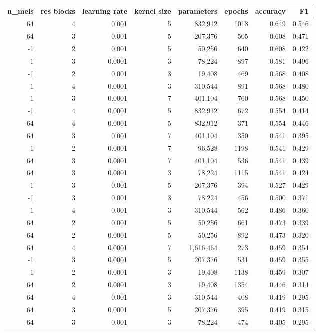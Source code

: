 \begin{tabular}{rrrrrrrr}
\toprule
\textbf{n\_mels} & \textbf{res blocks} & \textbf{learning rate} & \textbf{kernel size}& \textbf{parameters} & \textbf{epochs} & \textbf{accuracy} & \textbf{F1} \\
\midrule
64 & 4 & 0.001 & 5 & 832,912 & 1018 & 0.649 & 0.546 \\
64 & 3 & 0.001 & 5 & 207,376 & 505 & 0.608 & 0.471 \\
-1 & 2 & 0.001 & 5 & 50,256 & 640 & 0.608 & 0.422 \\
-1 & 3 & 0.0001 & 3 & 78,224 & 897 & 0.581 & 0.496 \\
-1 & 2 & 0.001 & 3 & 19,408 & 469 & 0.568 & 0.408 \\
-1 & 4 & 0.0001 & 3 & 310,544 & 891 & 0.568 & 0.480 \\
-1 & 3 & 0.0001 & 7 & 401,104 & 760 & 0.568 & 0.450 \\
-1 & 4 & 0.0001 & 5 & 832,912 & 672 & 0.554 & 0.414 \\
64 & 4 & 0.0001 & 5 & 832,912 & 371 & 0.554 & 0.446 \\
64 & 3 & 0.001 & 7 & 401,104 & 350 & 0.541 & 0.395 \\
-1 & 2 & 0.0001 & 7 & 96,528 & 1198 & 0.541 & 0.429 \\
64 & 3 & 0.0001 & 7 & 401,104 & 536 & 0.541 & 0.439 \\
64 & 3 & 0.0001 & 3 & 78,224 & 1115 & 0.541 & 0.424 \\
-1 & 3 & 0.001 & 5 & 207,376 & 394 & 0.527 & 0.429 \\
-1 & 3 & 0.001 & 3 & 78,224 & 456 & 0.500 & 0.371 \\
-1 & 4 & 0.001 & 3 & 310,544 & 562 & 0.486 & 0.360 \\
64 & 2 & 0.001 & 5 & 50,256 & 661 & 0.473 & 0.339 \\
64 & 2 & 0.0001 & 5 & 50,256 & 892 & 0.473 & 0.320 \\
64 & 4 & 0.0001 & 7 & 1,616,464 & 273 & 0.459 & 0.354 \\
-1 & 3 & 0.0001 & 5 & 207,376 & 531 & 0.459 & 0.355 \\
-1 & 2 & 0.0001 & 3 & 19,408 & 1138 & 0.459 & 0.307 \\
64 & 2 & 0.0001 & 3 & 19,408 & 1354 & 0.446 & 0.314 \\
64 & 4 & 0.001 & 3 & 310,544 & 408 & 0.419 & 0.295 \\
64 & 3 & 0.0001 & 5 & 207,376 & 395 & 0.419 & 0.315 \\
64 & 3 & 0.001 & 3 & 78,224 & 474 & 0.405 & 0.295 \\

\end{tabular}
